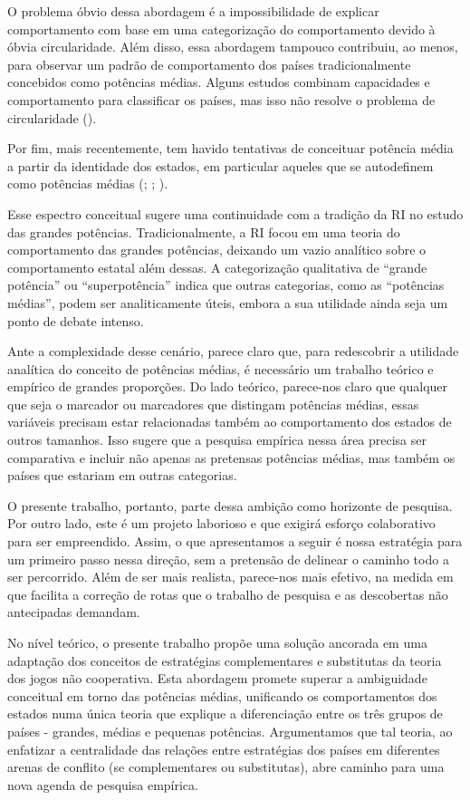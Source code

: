 \documentclass[]{interact}
\theoremstyle{plain}%
\theoremstyle{definition}
\theoremstyle{remark}
\begin{document}
O problema óbvio dessa abordagem é a impossibilidade de explicar
comportamento com base em uma categorização do comportamento devido à
óbvia circularidade. Além disso, essa abordagem tampouco contribuiu, ao
menos, para observar um padrão de comportamento dos países
tradicionalmente concebidos como potências médias. Alguns estudos
combinam capacidades e comportamento para classificar os países, mas
isso não resolve o problema de circularidade (\citet{cooper_11}).

Por fim, mais recentemente, tem havido tentativas de conceituar potência
média a partir da identidade dos estados, em particular aqueles que se
autodefinem como potências médias (\citet{hynek_07};
\citet{gecelovsky_09}; \citet{debhal_23}).

Esse espectro conceitual sugere uma continuidade com a tradição da RI no
estudo das grandes potências. Tradicionalmente, a RI focou em uma teoria
do comportamento das grandes potências, deixando um vazio analítico
sobre o comportamento estatal além dessas. A categorização qualitativa
de ``grande potência'' ou ``superpotência'' indica que outras
categorias, como as ``potências médias'', podem ser analiticamente
úteis, embora a sua utilidade ainda seja um ponto de debate intenso.

Ante a complexidade desse cenário, parece claro que, para redescobrir a
utilidade analítica do conceito de potências médias, é necessário um
trabalho teórico e empírico de grandes proporções. Do lado teórico,
parece-nos claro que qualquer que seja o marcador ou marcadores que
distingam potências médias, essas variáveis precisam estar relacionadas
também ao comportamento dos estados de outros tamanhos. Isso sugere que
a pesquisa empírica nessa área precisa ser comparativa e incluir não
apenas as pretensas potências médias, mas também os países que estariam
em outras categorias.

O presente trabalho, portanto, parte dessa ambição como horizonte de
pesquisa. Por outro lado, este é um projeto laborioso e que exigirá
esforço colaborativo para ser empreendido. Assim, o que apresentamos a
seguir é nossa estratégia para um primeiro passo nessa direção, sem a
pretensão de delinear o caminho todo a ser percorrido. Além de ser mais
realista, parece-nos mais efetivo, na medida em que facilita a correção
de rotas que o trabalho de pesquisa e as descobertas não antecipadas
demandam.

No nível teórico, o presente trabalho propõe uma solução ancorada em uma
adaptação dos conceitos de estratégias complementares e substitutas da
teoria dos jogos não cooperativa. Esta abordagem promete superar a
ambiguidade conceitual em torno das potências médias, unificando os
comportamentos dos estados numa única teoria que explique a
diferenciação entre os três grupos de países - grandes, médias e
pequenas potências. Argumentamos que tal teoria, ao enfatizar a
centralidade das relações entre estratégias dos países em diferentes
arenas de conflito (se complementares ou substitutas), abre caminho para
uma nova agenda de pesquisa empírica.
\end{document}
